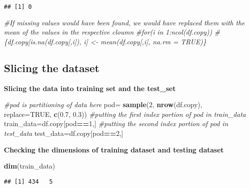 \documentclass[
]{article}
\newenvironment{Shaded}{\begin{snugshade}}{\end{snugshade}}
\newcommand{\CommentTok}[1]{\textcolor[rgb]{0.56,0.35,0.01}{\textit{#1}}}
\newcommand{\DataTypeTok}[1]{\textcolor[rgb]{0.13,0.29,0.53}{#1}}
\newcommand{\DecValTok}[1]{\textcolor[rgb]{0.00,0.00,0.81}{#1}}
\newcommand{\FloatTok}[1]{\textcolor[rgb]{0.00,0.00,0.81}{#1}}
\newcommand{\KeywordTok}[1]{\textcolor[rgb]{0.13,0.29,0.53}{\textbf{#1}}}
\newcommand{\NormalTok}[1]{#1}
\newcommand{\OperatorTok}[1]{\textcolor[rgb]{0.81,0.36,0.00}{\textbf{#1}}}
\newcommand{\OtherTok}[1]{\textcolor[rgb]{0.56,0.35,0.01}{#1}}
\newcommand{\StringTok}[1]{\textcolor[rgb]{0.31,0.60,0.02}{#1}}
\begin{document}
\begin{verbatim}
## [1] 0
\end{verbatim}

\begin{Shaded}
\begin{Highlighting}[]
\CommentTok{#If missing values would have been found, we would have replaced them with the mean of the values in the respective cloumn}
\CommentTok{#for(i in 1:ncol(df.copy))}
\CommentTok{#\{df.copy[is.na(df.copy[,i]), i] <- mean(df.copy[,i], na.rm = TRUE)\}}
\end{Highlighting}
\end{Shaded}

\hypertarget{slicing-the-dataset}{%
\subsection{\texorpdfstring{\textbf{Slicing the
dataset}}{Slicing the dataset}}\label{slicing-the-dataset}}

\textbf{Slicing the data into training set and the test\_set}

\begin{Shaded}
\begin{Highlighting}[]
\CommentTok{#pod is partitioning of data here}
\NormalTok{pod=}\StringTok{ }\KeywordTok{sample}\NormalTok{(}\DecValTok{2}\NormalTok{, }\KeywordTok{nrow}\NormalTok{(df.copy), }\DataTypeTok{replace=}\OtherTok{TRUE}\NormalTok{, }\KeywordTok{c}\NormalTok{(}\FloatTok{0.7}\NormalTok{, }\FloatTok{0.3}\NormalTok{))}
\CommentTok{#putting the first index portion of pod in train_data}
\NormalTok{train_data=df.copy[pod}\OperatorTok{==}\DecValTok{1}\NormalTok{,]}
\CommentTok{#putting the second index portion of pod in test_data}
\NormalTok{test_data=df.copy[pod}\OperatorTok{==}\DecValTok{2}\NormalTok{,]}
\end{Highlighting}
\end{Shaded}

\textbf{Checking the dimensions of training dataset and testing dataset}

\begin{Shaded}
\begin{Highlighting}[]
\KeywordTok{dim}\NormalTok{(train_data)}
\end{Highlighting}
\end{Shaded}

\begin{verbatim}
## [1] 434   5
\end{verbatim}
\end{document}
